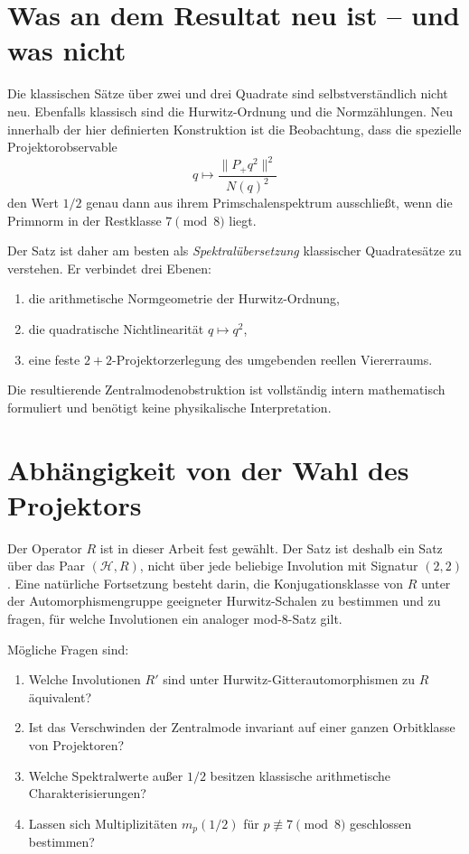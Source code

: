 \documentclass[11pt,a4paper]{article}
\theoremstyle{definition}
\newcommand{\HH}{\mathcal H}
\begin{document}
\section{Was an dem Resultat neu ist -- und was nicht}
Die klassischen Sätze über zwei und drei Quadrate sind selbstverständlich nicht neu. Ebenfalls klassisch sind die Hurwitz-Ordnung und die Normzählungen. Neu innerhalb der hier definierten Konstruktion ist die Beobachtung, dass die spezielle Projektorobservable
\[
q\mapsto\frac{\|P_+q^2\|^2}{N(q)^2}
\]
den Wert $1/2$ genau dann aus ihrem Primschalenspektrum ausschließt, wenn die Primnorm in der Restklasse $7\pmod8$ liegt.

Der Satz ist daher am besten als \emph{Spektralübersetzung} klassischer Quadratesätze zu verstehen. Er verbindet drei Ebenen:
\begin{enumerate}[label=(\roman*)]
\item die arithmetische Normgeometrie der Hurwitz-Ordnung,
\item die quadratische Nichtlinearität $q\mapsto q^2$,
\item eine feste $2+2$-Projektorzerlegung des umgebenden reellen Viererraums.
\end{enumerate}
Die resultierende Zentralmodenobstruktion ist vollständig intern mathematisch formuliert und benötigt keine physikalische Interpretation.

\section{Abhängigkeit von der Wahl des Projektors}
Der Operator $R$ ist in dieser Arbeit fest gewählt. Der Satz ist deshalb ein Satz über das Paar $(\HH,R)$, nicht über jede beliebige Involution mit Signatur $(2,2)$. Eine natürliche Fortsetzung besteht darin, die Konjugationsklasse von $R$ unter der Automorphismengruppe geeigneter Hurwitz-Schalen zu bestimmen und zu fragen, für welche Involutionen ein analoger mod-8-Satz gilt.

Mögliche Fragen sind:
\begin{enumerate}[label=(Q\arabic*)]
\item Welche Involutionen $R'$ sind unter Hurwitz-Gitterautomorphismen zu $R$ äquivalent?
\item Ist das Verschwinden der Zentralmode invariant auf einer ganzen Orbitklasse von Projektoren?
\item Welche Spektralwerte außer $1/2$ besitzen klassische arithmetische Charakterisierungen?
\item Lassen sich Multiplizitäten $m_p(1/2)$ für $p\not\equiv7\pmod8$ geschlossen bestimmen?
\end{enumerate}
\end{document}
